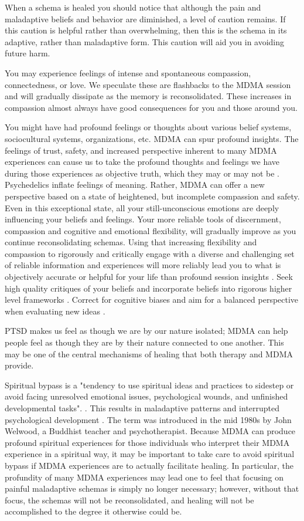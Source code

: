 \documentclass[12pt,letterpaper]{article}
\begin{document}
When a schema is healed you should notice that although the pain and maladaptive beliefs and behavior are diminished, a level of caution remains. If this caution is helpful rather than overwhelming, then this is the schema in its adaptive, rather than maladaptive form. This caution will aid you in avoiding future harm.

You may experience feelings of intense and spontaneous compassion, connectedness, or love. We speculate these are flashbacks to the MDMA session and will gradually dissipate as the memory is reconsolidated. These increases in compassion almost always have good consequences for you and those around you.

You might have had profound feelings or thoughts about various belief systems, sociocultural systems, organizations, etc. MDMA can spur profound insights. The feelings of trust, safety, and increased perspective inherent to many MDMA experiences can cause us to take the profound thoughts and feelings we have during those experiences as objective truth, which they may or may not be \cite{hartogsohn2018meaning}. Psychedelics inflate feelings of meaning. Rather, MDMA can offer a new perspective based on a state of heightened, but incomplete compassion and safety. Even in this exceptional state, all your still-unconscious emotions are deeply influencing your beliefs and feelings. Your more reliable tools of discernment, compassion and cognitive and emotional flexibility, will gradually improve as you continue reconsolidating schemas. Using that increasing flexibility and compassion to rigorously and critically engage with a diverse and challenging set of reliable information and experiences will more reliably lead you to what is objectively accurate or helpful for your life than profound session insights \cite{bentzMindfulInquiry}. Seek high quality critiques of your beliefs and incorporate beliefs into rigorous higher level frameworks \cite{saganDemon}. Correct for cognitive biases and aim for a balanced perspective when evaluating new ideas \cite{galefScoutMindset}.

PTSD makes us feel as though we are by our nature isolated; MDMA can help people feel as though they are by their nature connected to one another. This may be one of the central mechanisms of healing that both therapy and MDMA provide.

Spiritual bypass is a "tendency to use spiritual ideas and practices to sidestep or avoid facing unresolved emotional issues, psychological wounds, and unfinished developmental tasks". . This results in maladaptive patterns and interrupted psychological development . The term was introduced in the mid 1980s by John Welwood, a Buddhist teacher and psychotherapist. Because MDMA can produce profound spiritual experiences for those individuals who interpret their MDMA experience in a spiritual way, it may be important to take care to avoid spiritual bypass if MDMA experiences are to actually facilitate healing. In particular, the profundity of many MDMA experiences may lead one to feel that focusing on painful maladaptive schemas is simply no longer necessary; however, without that focus, the schemas will not be reconsolidated, and healing will not be accomplished to the degree it otherwise could be.
\end{document}
